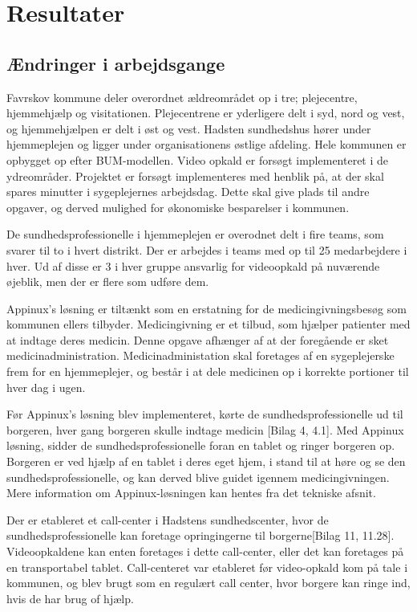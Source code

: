 \section{Resultater}
\subsection{Ændringer i arbejdsgange}
Favrskov kommune deler overordnet ældreområdet op i tre; plejecentre, hjemmehjælp og visitationen. Plejecentrene er yderligere delt i syd, nord og vest, og hjemmehjælpen er delt i øst og vest. Hadsten sundhedshus hører under hjemmeplejen og ligger under organisationens østlige afdeling. Hele kommunen er opbygget op efter BUM-modellen. Video opkald er forsøgt implementeret i de ydreområder. Projektet er forsøgt implementeres med henblik på, at der skal spares minutter i sygeplejernes arbejdsdag. Dette skal give plads til andre opgaver, og derved mulighed for økonomiske besparelser i kommunen. 

De sundhedsprofessionelle i hjemmeplejen er overodnet delt i fire teams, som svarer til to i hvert distrikt. Der er arbejdes i teams med op til 25 medarbejdere i hver. Ud af disse er 3 i hver gruppe ansvarlig for videoopkald på nuværende øjeblik, men der er flere som udføre dem.  

Appinux’s løsning er tiltænkt som en erstatning for de medicingivningsbesøg som kommunen ellers tilbyder. Medicingivning er et tilbud, som hjælper patienter med at indtage deres medicin. Denne opgave afhænger af at der foregående er sket medicinadministration. Medicinadministation skal foretages af en sygeplejerske frem for en hjemmeplejer, og består i at dele medicinen op i korrekte portioner til hver dag i ugen.

Før Appinux’s løsning blev implementeret, kørte de sundhedsprofessionelle ud til borgeren, hver gang borgeren skulle indtage medicin [Bilag 4, 4.1]. Med Appinux løsning, sidder de sundhedsprofessionelle foran en tablet og ringer borgeren op. Borgeren er ved hjælp af en tablet i deres eget hjem, i stand til at høre og se den sundhedsprofessionelle, og kan derved blive guidet igennem medicingivningen. Mere information om Appinux-løsningen kan hentes fra det tekniske afsnit. 

Der er etableret et call-center i Hadstens sundhedscenter, hvor de sundhedsprofessionelle kan foretage opringingerne til borgerne[Bilag 11, 11.28]. Videoopkaldene kan enten foretages i dette call-center, eller det kan foretages på en transportabel tablet. Call-centeret var etableret før video-opkald kom på tale i kommunen, og blev brugt som en regulært call center, hvor borgere kan ringe ind, hvis de har brug of hjælp.

